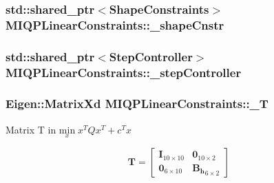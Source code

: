 \hypertarget{classMIQPLinearConstraints_a5c8788e52f7b0664606662cfa758ae88}{
\subsubsection[{\-\_\-shape\-Cnstr}]{\setlength{\rightskip}{0pt plus 5cm}std\-::shared\-\_\-ptr$<${\bf \-Shape\-Constraints}$>$ {\bf \-M\-I\-Q\-P\-Linear\-Constraints\-::\-\_\-shape\-Cnstr}}}\label{classMIQPLinearConstraints_a5c8788e52f7b0664606662cfa758ae88}
\hypertarget{classMIQPLinearConstraints_ac1ea7dbfb54c84c9c3e172d36aa42671}{
\subsubsection[{\-\_\-step\-Controller}]{\setlength{\rightskip}{0pt plus 5cm}std\-::shared\-\_\-ptr$<${\bf \-Step\-Controller}$>$ {\bf \-M\-I\-Q\-P\-Linear\-Constraints\-::\-\_\-step\-Controller}}}\label{classMIQPLinearConstraints_ac1ea7dbfb54c84c9c3e172d36aa42671}
\hypertarget{classMIQPLinearConstraints_a5e6d37521f3da248b19ff424526d700a}{
\subsubsection[{\-\_\-\-T}]{\setlength{\rightskip}{0pt plus 5cm}\-Eigen\-::\-Matrix\-Xd {\bf \-M\-I\-Q\-P\-Linear\-Constraints\-::\-\_\-\-T}}}\label{classMIQPLinearConstraints_a5e6d37521f3da248b19ff424526d700a}
\-Matrix \-T in $ \underset{x}{\text{min}}\; x^TQx^T + c^Tx $

\[ \mathbf{T} = \left[\begin{array}{cc} \mathbf{I}_{10\times10} & \mathbf{0}_{10\times2}\\ \mathbf{0}_{6\times10} & \mathbf{B_h}_{6\times2} \end{array}\right] \]

